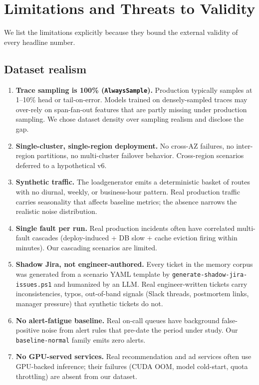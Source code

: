 \section{Limitations and Threats to Validity}
\label{sec:limitations}

We list the limitations explicitly because they bound the external validity of every headline number.

\subsection{Dataset realism}

\begin{enumerate}
\item \textbf{Trace sampling is 100\% (\texttt{AlwaysSample}).} Production typically samples at 1--10\% head or tail-on-error. Models trained on densely-sampled traces may over-rely on span-fan-out features that are partly missing under production sampling. We chose dataset density over sampling realism and disclose the gap.

\item \textbf{Single-cluster, single-region deployment.} No cross-AZ failures, no inter-region partitions, no multi-cluster failover behavior. Cross-region scenarios deferred to a hypothetical v6.

\item \textbf{Synthetic traffic.} The loadgenerator emits a deterministic basket of routes with no diurnal, weekly, or business-hour pattern. Real production traffic carries seasonality that affects baseline metrics; the absence narrows the realistic noise distribution.

\item \textbf{Single fault per run.} Real production incidents often have correlated multi-fault cascades (deploy-induced + DB slow + cache eviction firing within minutes). Our cascading scenarios are limited.

\item \textbf{Shadow Jira, not engineer-authored.} Every ticket in the memory corpus was generated from a scenario YAML template by \texttt{generate-shadow-jira-issues.ps1} and humanized by an LLM. Real engineer-written tickets carry inconsistencies, typos, out-of-band signals (Slack threads, postmortem links, manager pressure) that synthetic tickets do not.

\item \textbf{No alert-fatigue baseline.} Real on-call queues have background false-positive noise from alert rules that pre-date the period under study. Our \texttt{baseline-normal} family emits zero alerts.

\item \textbf{No GPU-served services.} Real recommendation and ad services often use GPU-backed inference; their failures (CUDA OOM, model cold-start, quota throttling) are absent from our dataset.
\end{enumerate}


